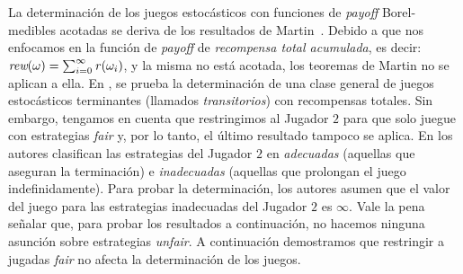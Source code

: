 La determinación de los juegos estocásticos con funciones de \textit{payoff} Borel-medibles acotadas se deriva de los resultados de Martin~\cite{Martin98}. Debido a que nos enfocamos en la función de \textit{payoff} de \emph{recompensa total acumulada}, es decir: $\textit{rew}(\omega) = \sum^\infty_{i=0}\mathit{r}(\omega_i)$, y la misma no está acotada, los teoremas de Martin no se aplican a ella. En \cite{FilarV96}, se prueba la determinación de una clase general de juegos estocásticos terminantes (llamados \emph{transitorios}) con recompensas totales. Sin embargo, tengamos en cuenta que restringimos al Jugador $2$ para que solo juegue con estrategias \textit{fair} y, por lo tanto, el último resultado tampoco se aplica.
%
En \cite{PatekBertsekas99} los autores clasifican las estrategias del Jugador $2$ en \emph{adecuadas} (aquellas que aseguran la terminación) e \emph{inadecuadas} (aquellas que prolongan el juego indefinidamente). Para probar la determinación, los autores asumen que el valor del juego para las estrategias inadecuadas del Jugador $2$ es $\infty$. Vale la pena señalar que, para probar los resultados a continuación, no hacemos ninguna asunción sobre estrategias \textit{unfair}.
%
A continuación demostramos que restringir a jugadas \textit{fair} no afecta la determinación de los juegos.
